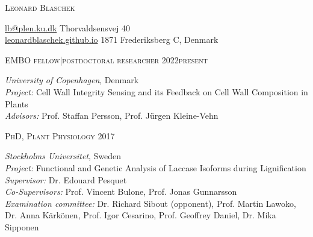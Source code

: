 \documentclass[11pt]{article}
\begin{document}
	\setlength\parindent{15pt}
\begin{center}
	\huge{\textsc{Leonard Blaschek}}
	\vspace*{0.2cm}
\end{center}

\noindent
	\href{mailto:lb@plen.ku.dk}{lb@plen.ku.dk} \hfill Thorvaldsensvej 40\\
	\href{https://leonardblaschek.github.io}{leonardblaschek.github.io} \hfill 1871 Frederiksberg C, Denmark%
	\vspace{0.2cm}
	
	
	\vspace{0.75cm}
	\raggedright
	
\vspace{0.15cm}
\begin{addmargin}[15pt]{0pt}
\textsc{\large{EMBO fellow|postdoctoral researcher} \hfill \textsc{2022\textendash present}}
\end{addmargin}
\begin{addmargin}[24pt]{0pt}
	\textit{University of Copenhagen}, Denmark\\
	\textit{Project:} Cell Wall Integrity Sensing and its Feedback on Cell Wall Composition in Plants \\
	\textit{Advisors:} Prof. Staffan Persson, Prof. Jürgen Kleine-Vehn\\
\end{addmargin}
\vspace{0.5cm}
	
\vspace{0.15cm}

\begin{addmargin}[15pt]{0pt}
\textsc{\large{PhD, Plant Physiology} \hfill \textsc{2017}}
\end{addmargin}
\begin{addmargin}[24pt]{0pt}
	\textit{Stockholms Universitet}, Sweden \\
	\textit{Project:} Functional and Genetic Analysis of Laccase Isoforms during Lignification \\
	\textit{Supervisor:} Dr. Edouard Pesquet \\
	\textit{Co-Supervisors:} Prof. Vincent Bulone, Prof. Jonas Gunnarsson\\
	\textit{Examination committee:} Dr. Richard Sibout (opponent), Prof. Martin Lawoko, Dr. Anna Kärkönen, Prof. Igor Cesarino, Prof. Geoffrey Daniel, Dr. Mika Sipponen
\end{addmargin}
\vspace{0.2cm}
\end{document}
